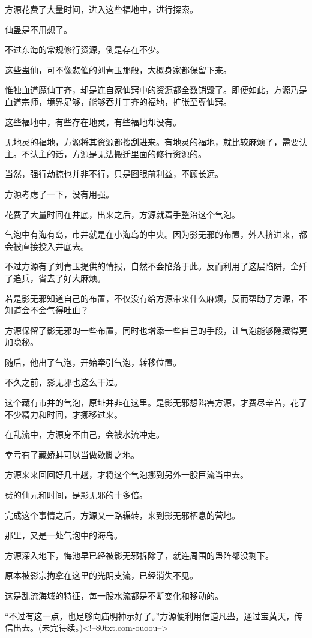 \begin{this_body}
方源花费了大量时间，进入这些福地中，进行探索。

仙蛊是不用想了。

不过东海的常规修行资源，倒是存在不少。

这些蛊仙，可不像悲催的刘青玉那般，大概身家都保留下来。

惟独血道魔仙丁齐，却是连自家仙窍中的资源都全数销毁了。即便如此，方源乃是血道宗师，境界足够，能够吞并丁齐的福地，扩张至尊仙窍。

这些福地中，有些存在地灵，有些福地却没有。

无地灵的福地，方源将其资源都搜刮进来。有地灵的福地，就比较麻烦了，需要认主。不认主的话，方源是无法搬迁里面的修行资源的。

当然，强行劫掠也并非不行，只是图眼前利益，不顾长远。

方源考虑了一下，没有用强。

花费了大量时间在井底，出来之后，方源就着手整治这个气泡。

气泡中有海有岛，市井就是在小海岛的中央。因为影无邪的布置，外人挤进来，都会被直接投入井底去。

不过方源有了刘青玉提供的情报，自然不会陷落于此。反而利用了这层陷阱，全歼了追兵，省去了好大麻烦。

若是影无邪知道自己的布置，不仅没有给方源带来什么麻烦，反而帮助了方源，不知道会不会气得吐血？

方源保留了影无邪的一些布置，同时也增添一些自己的手段，让气泡能够隐藏得更加隐秘。

随后，他出了气泡，开始牵引气泡，转移位置。

不久之前，影无邪也这么干过。

这个藏有市井的气泡，原址并非在这里。是影无邪想陷害方源，才费尽辛苦，花了不少精力和时间，才挪移过来。

在乱流中，方源身不由己，会被水流冲走。

幸亏有了藏娇蚌可以当做歇脚之地。

方源来来回回好几十趟，才将这个气泡挪到另外一股巨流当中去。

费的仙元和时间，是影无邪的十多倍。

完成这个事情之后，方源又一路辗转，来到影无邪栖息的营地。

那里，又是一处气泡中的海岛。

方源深入地下，悔池早已经被影无邪拆除了，就连周围的蛊阵都没剩下。

原本被影宗拘拿在这里的光阴支流，已经消失不见。

这是乱流海域的特征，每一股水流都是不断变化和移动的。

“不过有这一点，也足够向庙明神示好了。”方源便利用信道凡蛊，通过宝黄天，传信出去。(未完待续。)<!--80txt.com-ouoou-->

\end{this_body}

